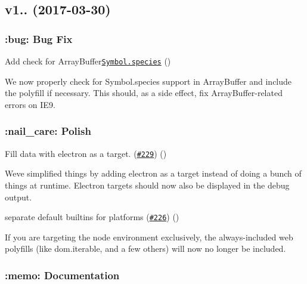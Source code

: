 \subsection*{v1.. (2017-\/03-\/30)}

\subsubsection*{\+:bug\+: Bug Fix}


\begin{DoxyItemize}
\item Add check for Array\+Buffer\href{[#233](https://github.com/babel/babel-preset-env/pull/233)}{\tt Symbol.\+species} ()
\end{DoxyItemize}

We now properly check for {\ttfamily Symbol.\+species} support in Array\+Buffer and include the polyfill if necessary. This should, as a side effect, fix Array\+Buffer-\/related errors on I\+E9.

\subsubsection*{\+:nail\+\_\+care\+: Polish}


\begin{DoxyItemize}
\item Fill data with electron as a target. (\href{https://github.com/babel/babel-preset-env/pull/229}{\tt \#229}) ()
\end{DoxyItemize}

We\textquotesingle{}ve simplified things by adding {\ttfamily electron} as a target instead of doing a bunch of things at runtime. Electron targets should now also be displayed in the debug output.


\begin{DoxyItemize}
\item separate default builtins for platforms (\href{https://github.com/babel/babel-preset-env/pull/226}{\tt \#226}) ()
\end{DoxyItemize}

If you are targeting the {\ttfamily node} environment exclusively, the always-\/included web polyfills (like {\ttfamily dom.\+iterable}, and a few others) will now no longer be included.

\subsubsection*{\+:memo\+: Documentation}


